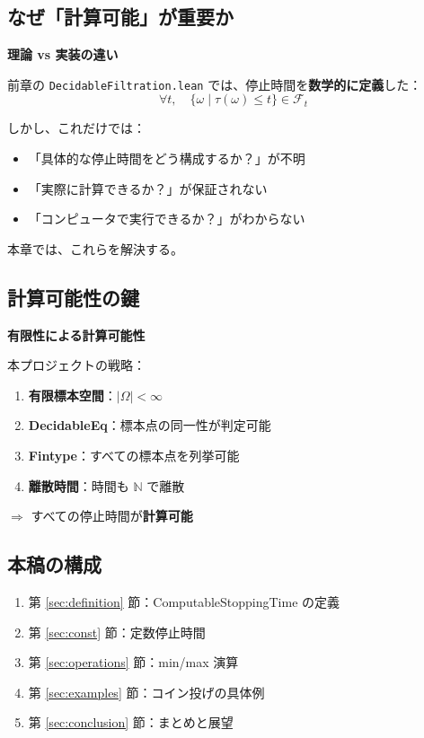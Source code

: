 \documentclass[12pt,a4paper,ja=standard]{bxjsarticle}
\theoremstyle{definition}
\begin{document}
\subsection{なぜ「計算可能」が重要か}

\begin{insight}
\textbf{理論 vs 実装の違い}

前章の \texttt{DecidableFiltration.lean} では、停止時間を\textbf{数学的に定義}した：
\[
\forall t, \quad \{\omega \mid \tau(\omega) \leq t\} \in \mathcal{F}_t
\]

しかし、これだけでは：
\begin{itemize}
    \item 「具体的な停止時間をどう構成するか？」が不明
    \item 「実際に計算できるか？」が保証されない
    \item 「コンピュータで実行できるか？」がわからない
\end{itemize}

本章では、これらを解決する。
\end{insight}

\subsection{計算可能性の鍵}

\begin{keypoint}
\textbf{有限性による計算可能性}

本プロジェクトの戦略：
\begin{enumerate}
    \item \textbf{有限標本空間}：$|\Omega| < \infty$
    \item \textbf{DecidableEq}：標本点の同一性が判定可能
    \item \textbf{Fintype}：すべての標本点を列挙可能
    \item \textbf{離散時間}：時間も $\mathbb{N}$ で離散
\end{enumerate}

$\Rightarrow$ すべての停止時間が\textbf{計算可能}
\end{keypoint}

\subsection{本稿の構成}

\begin{enumerate}
    \item 第 \ref{sec:definition} 節：ComputableStoppingTime の定義
    \item 第 \ref{sec:const} 節：定数停止時間
    \item 第 \ref{sec:operations} 節：min/max 演算
    \item 第 \ref{sec:examples} 節：コイン投げの具体例
    \item 第 \ref{sec:conclusion} 節：まとめと展望
\end{enumerate}
\end{document}
